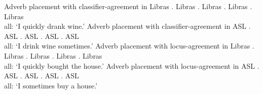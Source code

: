 \documentclass[output=paper]{langscibook}
\begin{document}
\ea 
    \label{lasz:ex:24}
    Adverb placement with classifier-agreement in Libras
    \ea 
         \textbf{} \laszHs{\laszClaw} . 
        \hfill \cmark Libras 
    \ex 
        \laszHs{\laszClaw}  \textbf{}.
        \hfill \cmark Libras
    \ex 
         \textbf{} \laszHs{\laszClaw}.
        \hfill \cmark Libras
    \ex 
        \laszHs{\laszClaw} \textbf{}. 
        \hfill \cmark Libras
        \\ 
        \glt all: ‘I quickly drank wine.’
    \z 
\ex 
    \label{lasz:ex:25}
    Adverb placement with classifier-agreement in ASL
    \ea 
         \textbf{} \laszHs{\laszClaw} .
        \hfill \cmark ASL
    \ex 
        \laszHs{\laszClaw}  \textbf{}.
        \hfill \cmark ASL
    \ex 
         \textbf{} \laszHs{\laszClaw}.
        \hfill \cmark ASL
    \ex 
        \laszHs{\laszClaw} \textbf{}. 
        \hfill \cmark ASL
        \\ 
        \glt all: ‘I drink wine sometimes.’
    \z 
\ex 
    \label{lasz:ex:26}
    Adverb placement with locus-agreement in Libras
    \ea 
         \textbf{}  .
        \hfill \cmark Libras
    \ex 
           \textbf{}.
        \hfill \cmark Libras
    \ex 
         \textbf{}  .
        \hfill \cmark Libras
    \ex 
          \textbf{}. 
        \hfill \cmark Libras
        \\ 
        \glt all: ‘I quickly bought the house.’
    \z 
\ex
    \label{lasz:ex:27}
    Adverb placement with locus-agreement in ASL
    \ea 
         \textbf{}  .
        \hfill \cmark ASL
    \ex 
           \textbf{}.
        \hfill \cmark ASL
    \ex 
         \textbf{}  .
        \hfill \cmark ASL
    \ex 
          \textbf{}. 
        \hfill \cmark ASL
        \\ 
        all: `I sometimes buy a house.' 
    \z 
\z 
\end{document}
